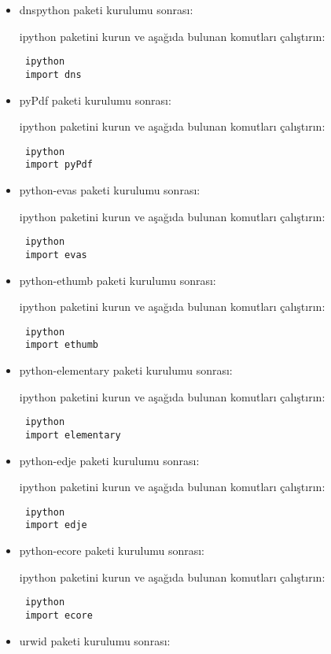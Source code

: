 \documentclass[a4paper,10pt]{article}
\begin{document}
\begin{itemize}
\item dnspython paketi kurulumu sonrası:

ipython paketini kurun ve aşağıda bulunan komutları çalıştırın:
\begin{verbatim}
 ipython
 import dns
\end{verbatim}
\item pyPdf paketi kurulumu sonrası:

ipython paketini kurun ve aşağıda bulunan komutları çalıştırın:
\begin{verbatim}
 ipython
 import pyPdf
\end{verbatim}

\item python-evas paketi kurulumu sonrası:

ipython paketini kurun ve aşağıda bulunan komutları çalıştırın:
\begin{verbatim}
 ipython
 import evas
\end{verbatim}

\item python-ethumb paketi kurulumu sonrası:

ipython paketini kurun ve aşağıda bulunan komutları çalıştırın:
\begin{verbatim}
 ipython
 import ethumb
\end{verbatim}

\item python-elementary paketi kurulumu sonrası:

ipython paketini kurun ve aşağıda bulunan komutları çalıştırın:
\begin{verbatim}
 ipython
 import elementary
\end{verbatim}

\item python-edje paketi kurulumu sonrası:

ipython paketini kurun ve aşağıda bulunan komutları çalıştırın:
\begin{verbatim}
 ipython
 import edje
\end{verbatim}



\item python-ecore paketi kurulumu sonrası:

ipython paketini kurun ve aşağıda bulunan komutları çalıştırın:
\begin{verbatim}
 ipython
 import ecore
\end{verbatim}


\item urwid paketi kurulumu sonrası:


\end{itemize}
\end{document}
